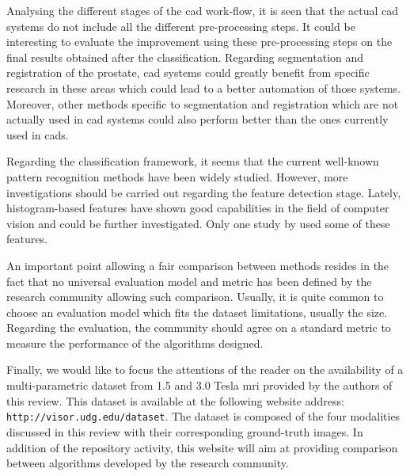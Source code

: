 Analysing the different stages of the \ac{cad} work-flow, it is seen that the actual \ac{cad} systems do not include all the different pre-processing steps. It could be interesting to evaluate the improvement using these pre-processing steps on the final results obtained after the classification. Regarding segmentation and registration of the prostate, \ac{cad} systems could greatly benefit from specific research in these areas which could lead to a better automation of those systems. Moreover, other methods specific to segmentation and registration which are not actually used in \ac{cad} systems could also perform better than the ones currently used in \acp{cad}.

Regarding the classification framework, it seems that the current well-known pattern recognition methods have been widely studied. However, more investigations should be carried out regarding the feature detection stage. Lately, histogram-based features have shown good capabilities in the field of computer vision and could be further investigated. Only one study by \cite{Liu2013} used some of these features.

An important point allowing a fair comparison between methods resides in the fact that no universal evaluation model and metric has been defined by the research community allowing such comparison. Usually, it is quite common to choose an evaluation model which fits the dataset limitations, usually the size. Regarding the evaluation, the community should agree on a standard metric to measure the performance of the algorithms designed.

Finally, we would like to focus the attentions of the reader on the availability of a multi-parametric dataset from 1.5 and 3.0 Tesla \ac{mri} provided by the authors of this review. This dataset is available at the following website address: \texttt{http://visor.udg.edu/dataset}. The dataset is composed of the four modalities discussed in this review with their corresponding ground-truth images. In addition of the repository activity, this website will aim at providing comparison between algorithms developed by the research community.